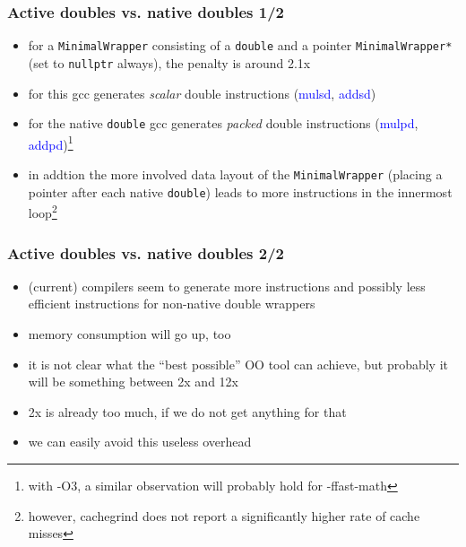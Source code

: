 \documentclass[10pt,German]{beamer}
\begin{document}
\begin{frame}[fragile]
\frametitle{Active doubles vs. native doubles 1/2}
\begin{itemize}
\item for a \verb+MinimalWrapper+ consisting of a \verb+double+ and a pointer \verb+MinimalWrapper*+ (set to \verb+nullptr+ always), the penalty is around 2.1x
\item for this gcc generates \textit{scalar} double instructions (\textcolor{blue}{mulsd}, \textcolor{blue}{addsd})
\item for the native \verb+double+ gcc generates \textit{packed} double instructions (\textcolor{blue}{mulpd}, \textcolor{blue}{addpd})\footnote{with -O3, a similar observation will probably hold for -ffast-math}
\item in addtion the more involved data layout of the \verb+MinimalWrapper+ (placing a pointer after each native \verb+double+) leads to more instructions in the innermost loop\footnote{however, cachegrind does not report a significantly higher rate of cache misses}
\end{itemize}
\end{frame}

\begin{frame}[fragile]
\frametitle{Active doubles vs. native doubles 2/2}
\begin{itemize}
\item (current) compilers seem to generate more instructions and possibly less efficient instructions for non-native double wrappers
\item memory consumption will go up, too
\item it is not clear what the ``best possible'' OO tool can achieve, but probably it will be something between 2x and 12x
\item 2x is already too much, if we do not get anything for that
\item we can easily avoid this useless overhead
\end{itemize}
\end{frame}
\end{document}
